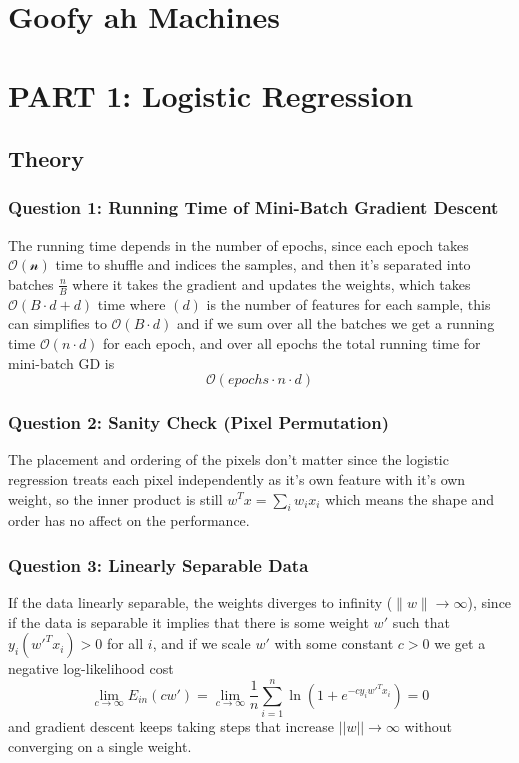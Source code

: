 \documentclass[12pt]{article}
\begin{document}
\section*{Goofy ah Machines}

\section*{PART 1: Logistic Regression}

\subsection*{Theory}

\subsubsection*{Question 1: Running Time of Mini-Batch Gradient Descent}
The running time depends in the number of epochs, since each epoch takes $\mathcal{O(n)}$ time to shuffle and indices the samples, and then it's separated into batches $\frac{n}{B}$ where it takes the gradient and updates the weights, which takes $\mathcal{O}(B \cdot d+d)$ time where $(d)$ is the number of features for each sample, this can simplifies to $\mathcal{O}(B \cdot d)$ and if we sum over all the batches we get a running time $\mathcal{O}(n \cdot d )$ for each epoch, and over all epochs the total running time for mini-batch GD is
\[
\mathcal{O}(epochs \cdot n \cdot d)
\]
\subsubsection*{Question 2: Sanity Check (Pixel Permutation)}
The placement and ordering of the pixels don't matter since the logistic regression treats each pixel independently as it's own feature with it's own weight, so the inner product is still $w^Tx = \sum_i w_ix_i$ which means the shape and order has no affect on the performance. 

\subsubsection*{Question 3: Linearly Separable Data}
If the data linearly separable, the weights diverges to infinity ($\|w\| \to \infty$), since if the data is separable it implies that there is some weight $w'$ such that $y_i(w'^Tx_i) > 0$ for all $i$, and if we scale $w'$ with some constant $c >0$ we get a negative log-likelihood cost
\[
\lim_{c \rightarrow \infty} E_{in}(cw') = \lim_{c \rightarrow \infty} \frac{1}{n} \sum_{i = 1}^n \ln(1+e^{-cy_iw'^{T}x_i}) = 0
\]
and gradient descent keeps taking steps that increase $||w|| \rightarrow \infty$ without converging on a single weight.
\clearpage
\end{document}
